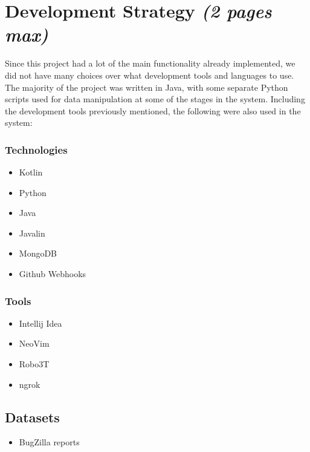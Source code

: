 \documentclass[12pt]{article}
\providecommand{\tightlist}{%
  \setlength{\itemsep}{0pt}\setlength{\parskip}{0pt}}
\begin{document}
\hypertarget{development-strategy-2-pages-max}{%
\section{\texorpdfstring{Development Strategy \emph{(2 pages
max)}}{Development Strategy (2 pages max)}}\label{development-strategy-2-pages-max}}

Since this project had a lot of the main functionality already
implemented, we did not have many choices over what development tools
and languages to use. The majority of the project was written in Java,
with some separate Python scripts used for data manipulation at some of
the stages in the system. Including the development tools previously
mentioned, the following were also used in the system:

\hypertarget{technologies}{%
\subsubsection{Technologies}\label{technologies}}

\begin{itemize}
\tightlist
\item
  Kotlin
\item
  Python
\item
  Java
\item
  Javalin
\item
  MongoDB
\item
  Github Webhooks
\end{itemize}

\hypertarget{tools}{%
\subsubsection{Tools}\label{tools}}

\begin{itemize}
\tightlist
\item
  Intellij Idea
\item
  NeoVim
\item
  Robo3T
\item
  ngrok
\end{itemize}

\hypertarget{datasets}{%
\subsection{Datasets}\label{datasets}}

\begin{itemize}
\tightlist
\item
  BugZilla reports
\end{itemize}
\end{document}
